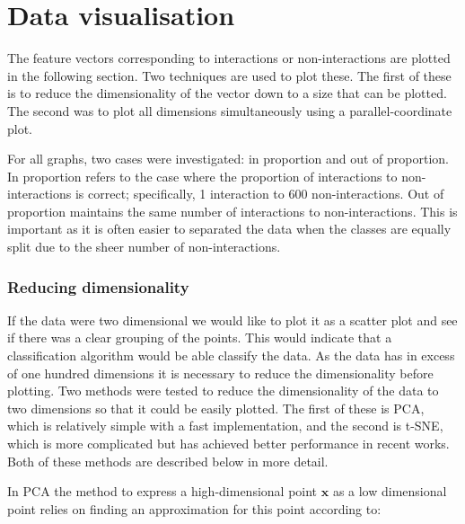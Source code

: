 
\section{Data visualisation}
\label{dataviz}

The feature vectors corresponding to interactions or non-interactions are plotted in the following section.
Two techniques are used to plot these.
The first of these is to reduce the dimensionality of the vector down to a size that can be plotted.
The second was to plot all dimensions simultaneously using a parallel-coordinate plot.

For all graphs, two cases were investigated: in proportion and out of proportion.
In proportion refers to the case where the proportion of interactions to non-interactions is correct; specifically, 1 interaction to 600 non-interactions.
Out of proportion maintains the same number of interactions to non-interactions.
This is important as it is often easier to separated the data when the classes are equally split due to the sheer number of non-interactions.

\subsubsection*{Reducing dimensionality}
If the data were two dimensional we would like to plot it as a scatter plot and see if there was a clear grouping of the points.
This would indicate that a classification algorithm would be able classify the data.
As the data has in excess of one hundred dimensions it is necessary to reduce the dimensionality before plotting.
Two methods were tested to reduce the dimensionality of the data to two dimensions so that it could be easily plotted.
The first of these is \ac{PCA}, which is relatively simple with a fast implementation, and the second is t-SNE, which is more complicated but has achieved better performance in recent works.
Both of these methods are described below in more detail.

In \ac{PCA} the method to express a high-dimensional point $\pmb{x}$ as a low dimensional point relies on finding an approximation for this point according to\autocite[330]{barber_bayesian_2012}:

